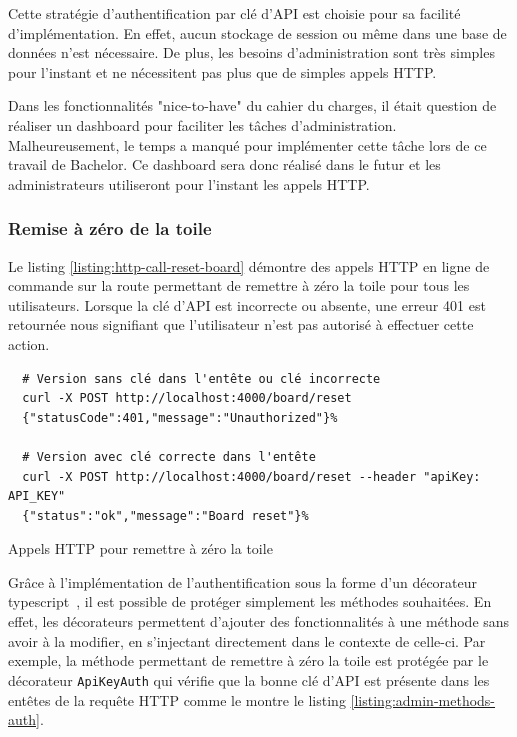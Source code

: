 Cette stratégie d'authentification par clé d'API est choisie pour sa facilité d'implémentation. En effet, aucun stockage de session ou même dans une base de données n'est nécessaire. De plus, les besoins d'administration sont très simples pour l'instant et ne nécessitent pas plus que de simples appels HTTP.

Dans les fonctionnalités "nice-to-have" du cahier du charges, il était question de réaliser un dashboard pour faciliter les tâches d'administration. Malheureusement, le temps a manqué pour implémenter cette tâche lors de ce travail de Bachelor. Ce dashboard sera donc réalisé dans le futur et les administrateurs utiliseront pour l'instant les appels HTTP.

\subsubsection{Remise à zéro de la toile}

Le listing \ref{listing:http-call-reset-board} démontre des appels HTTP en ligne de commande sur la route permettant de remettre à zéro la toile pour tous les utilisateurs. Lorsque la clé d'API est incorrecte ou absente, une erreur 401 est retournée nous signifiant que l'utilisateur n'est pas autorisé à effectuer cette action.

\begin{listing}[h]
  \begin{verbatim}
  # Version sans clé dans l'entête ou clé incorrecte
  curl -X POST http://localhost:4000/board/reset
  {"statusCode":401,"message":"Unauthorized"}%

  # Version avec clé correcte dans l'entête
  curl -X POST http://localhost:4000/board/reset --header "apiKey: API_KEY"
  {"status":"ok","message":"Board reset"}%
\end{verbatim}
  \caption{Appels HTTP pour remettre à zéro la toile}
  \label{listing:http-call-reset-board}
\end{listing}

Grâce à l'implémentation de l'authentification sous la forme d'un décorateur \gls{typescript}~\cite{typescript-decorators}, il est possible de protéger simplement les méthodes souhaitées. En effet, les décorateurs permettent d'ajouter des fonctionnalités à une méthode sans avoir à la modifier, en s'injectant directement dans le contexte de celle-ci. Par exemple, la méthode permettant de remettre à zéro la toile est protégée par le décorateur \texttt{ApiKeyAuth} qui vérifie que la bonne clé d'API est présente dans les entêtes de la requête HTTP comme le montre le listing \ref{listing:admin-methods-auth}.

